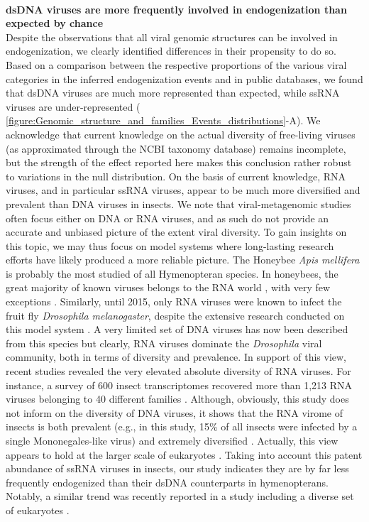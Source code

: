 \textbf{\\dsDNA viruses are more frequently involved in endogenization than expected by chance}
\\Despite the observations that all viral genomic structures can be involved in endogenization, we clearly identified differences in their propensity to do so. Based on a comparison between the respective proportions of the various viral categories in the inferred endogenization events and in public databases, we found that dsDNA viruses are much more represented than expected, while ssRNA viruses are under-represented (\figurename{ \ref{figure:Genomic_structure_and_families_Events_distributions}-A}). We acknowledge that current knowledge on the actual diversity of free-living viruses (as approximated through the NCBI taxonomy database) remains incomplete, but the strength of the effect reported here makes this conclusion rather robust to variations in the null distribution. On the basis of current knowledge, RNA viruses, and in particular ssRNA viruses, appear to be much more diversified and prevalent than DNA viruses in insects. We note that viral-metagenomic studies often focus either on DNA or RNA viruses, and as such do not provide an accurate and unbiased picture of the extent viral diversity. To gain insights on this topic, we may thus focus on model systems where long-lasting research efforts have likely produced a more reliable picture. The Honeybee \textit{Apis mellifera} is probably the most studied of all Hymenopteran species. In honeybees, the great majority of known viruses belongs to the RNA world \citep{chen_honey_2007}, with very few exceptions \citep{yang_genomics_2022}. Similarly, until 2015, only RNA viruses were known to infect the fruit fly \textit{Drosophila melanogaster}, despite the extensive research conducted on this model system \citep{webster_discovery_2015}. A very limited set of DNA viruses has now been described from this species \citep{wallace_discovery_2021} but clearly, RNA viruses dominate the \textit{Drosophila} viral community, both in terms of diversity and prevalence. In support of this view, recent studies revealed the very elevated absolute diversity of RNA viruses. For instance, a survey of 600 insect transcriptomes recovered more than 1,213 RNA viruses belonging to 40 different families \citep{wu_abundant_2020-1}. Although, obviously, this study does not inform on the diversity of DNA viruses, it shows that the RNA virome of insects is both prevalent (e.g., in this study, 15\% of all insects were infected by a single Mononegales-like virus) and extremely diversified \citep{wu_abundant_2020-1}. Actually, this view appears to hold at the larger scale of eukaryotes \citep{koonin_origins_2015}. Taking into account this patent abundance of ssRNA viruses in insects, our study indicates they are by far less frequently endogenized than their dsDNA counterparts in hymenopterans. Notably, a similar trend was recently reported in a study including a diverse set of eukaryotes \citep{irwin_systematic_2022}.

